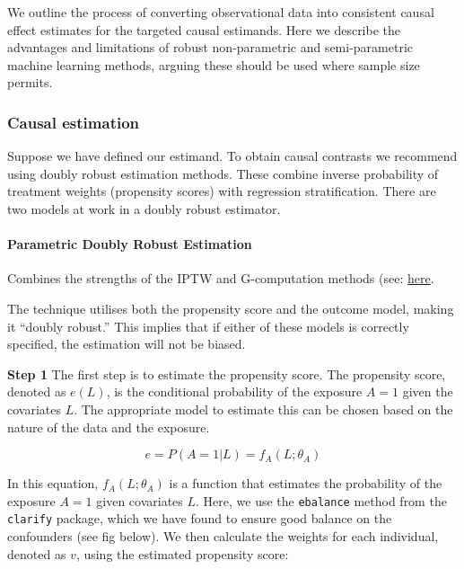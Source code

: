 \documentclass[
  singlecolumn]{article}
\let\oldparagraph\paragraph
\renewcommand{\paragraph}[1]{\oldparagraph{#1}\mbox{}}
\begin{document}
We outline the process of converting observational data into consistent
causal effect estimates for the targeted causal estimands. Here we
describe the advantages and limitations of robust non-parametric and
semi-parametric machine learning methods, arguing these should be used
where sample size permits.

\subsubsection{Causal estimation}\label{causal-estimation}

Suppose we have defined our estimand. To obtain causal contrasts we
recommend using doubly robust estimation methods. These combine inverse
probability of treatment weights (propensity scores) with regression
stratification. There are two models at work in a doubly robust
estimator.

\paragraph{Parametric Doubly Robust
Estimation}\label{parametric-doubly-robust-estimation}

Combines the strengths of the IPTW and G-computation methods (see:
\href{https://go-bayes.github.io/psych-434-2023/content/09-content.html\#comprehensive-checklist-for-detailed-reporting-of-a-causal-inferenctial-study-e.g.-assessment-3-option-2}{here}.

The technique utilises both the propensity score and the outcome model,
making it ``doubly robust.'' This implies that if either of these models
is correctly specified, the estimation will not be biased.

\textbf{Step 1} The first step is to estimate the propensity score. The
propensity score, denoted as \(e(L)\), is the conditional probability of
the exposure \(A = 1\) given the covariates \(L\). The appropriate model
to estimate this can be chosen based on the nature of the data and the
exposure.

\[e = P(A = 1 | L) = f_A(L; \theta_A)\]

In this equation, \(f_A(L; \theta_A)\) is a function that estimates the
probability of the exposure \(A = 1\) given covariates \(L\). Here, we
use the \texttt{ebalance} method from the \texttt{clarify} package,
which we have found to ensure good balance on the confounders (see fig
below). We then calculate the weights for each individual, denoted as
\(v\), using the estimated propensity score:
\end{document}
